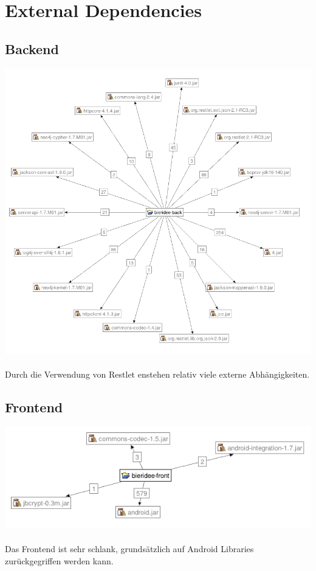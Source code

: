 \documentclass[10pt,a4paper]{scrartcl}
\begin{document}
\section{External Dependencies}
\subsection{Backend}
\includegraphics[scale=0.7, width=\textwidth]{External-Dependecies-Back.png}\\
\\
Durch die Verwendung von Restlet enstehen relativ viele externe Abhängigkeiten. 
\subsection{Frontend}
\includegraphics[width=\textwidth]{External-Dependecies-Front.png}\\
\\
Das Frontend ist sehr schlank, grundsätzlich auf Android Libraries zurückgegriffen werden kann.
\end{document}
